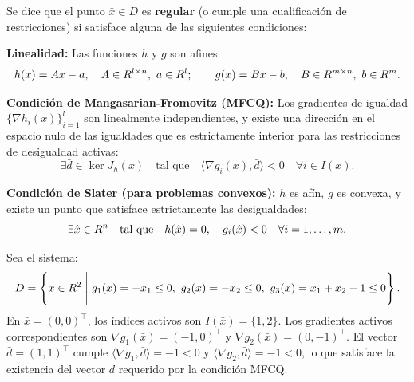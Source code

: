 \begin{definition}\label{v1:def:regularidad_mixta}
 Se dice que el punto $\bar{x} \in D$ es \textbf{regular} (o cumple una cualificación de restricciones) si satisface alguna de las siguientes condiciones:
 
 \begin{enuthm}
 \item \textbf{Linealidad:} Las funciones $h$ y $g$ son afines:
 \begin{equation}
 h(x) = Ax - a, \quad A \in R^{l \times n}, \ a \in R^l; \qquad g(x) = Bx - b, \quad B \in R^{m \times n}, \ b \in R^m.
 \label{v1:eq:4.7}
 \end{equation}
 
 \item \textbf{Condición de Mangasarian-Fromovitz (MFCQ):} Los gradientes de igualdad $\{ \nabla h_i(\bar{x}) \}_{i=1}^l$ son linealmente independientes, y existe una dirección en el espacio nulo de las igualdades que es estrictamente interior para las restricciones de desigualdad activas:
 \begin{equation}
 \exists \bar{d} \in \ker J_h(\bar{x}) \quad \text{tal que} \quad \langle \nabla g_i(\bar{x}), \bar{d} \rangle < 0 \quad \forall i \in I(\bar{x}).
 \label{v1:eq:4.8}
 \end{equation}
 
 \item \textbf{Condición de Slater (para problemas convexos):} $h$ es afín, $g$ es convexa, y existe un punto que satisface estrictamente las desigualdades:
 \begin{equation}
 \exists \hat{x} \in R^n \quad \text{tal que} \quad h(\hat{x}) = 0, \quad g_i(\hat{x}) < 0 \quad \forall i = 1, \dots, m.
 \label{v1:eq:4.10}
 \end{equation}
 \end{enuthm}
\end{definition}

\begin{example}\label{v1:exa:analisis_mfcq}
 Sea el sistema:
 \[
 D = \left\{ x \in R^2 \mathrel{\Bigg|} g_1(x) = -x_1 \le 0, \ g_2(x) = -x_2 \le 0, \ g_3(x) = x_1 + x_2 - 1 \le 0 \right\}.
 \]
 En $\bar{x} = (0,0)^\top$, los índices activos son $I(\bar{x}) = \{1, 2\}$. Los gradientes activos correspondientes son $\nabla g_1(\bar{x}) = (-1, 0)^\top$ y $\nabla g_2(\bar{x}) = (0, -1)^\top$. El vector $\bar{d} = (1, 1)^\top$ cumple $\langle \nabla g_1, \bar{d} \rangle = -1 < 0$ y $\langle \nabla g_2, \bar{d} \rangle = -1 < 0$, lo que satisface la existencia del vector $\bar{d}$ requerido por la condición MFCQ.
\end{example}

